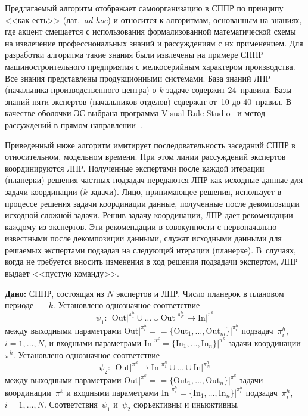 \begin{multicols}{2}
  Предлагаемый алгоритм отображает самоорганизацию в СППР по принципу 
<<как есть>> (лат.\ \textit{ad hoc}) и относится к алгоритмам, основанным на знаниях, 
где акцент смещается с использования формализованной математической 
схемы на извлечение профессиональных знаний и рассуждениям с их 
применением. Для разработки алгоритма такие знания были извлечены на 
примере СППР машиностроительного предприятия с мелкосерийным 
характером производства. Все знания пред\-став\-ле\-ны продукционными 
системами. База знаний ЛПР (начальника производственного центра) о 
  $k$-за\-да\-че содержит 24~правила. Базы знаний пяти экспертов 
(начальников отделов) содержат от~10 до 40~правил. В качестве оболочки ЭС 
выбрана программа Visual Rule Studio~\cite{14kol} и метод рассуждений в 
прямом направлении~\cite{8kol}.
  
  Приведенный ниже алгоритм имитирует последовательность заседаний 
СППР в относительном, модельном времени. При этом линии рассуждений 
экспертов координируются ЛПР. Полученные экспертами после каждой 
итерации (планерки) решения частных подзадач передаются ЛПР как исходные 
данные для задачи координации ($k$-за\-да\-чи). Лицо, принимающее решения, использует в процессе 
решения задачи координации данные, полученные после декомпозиции 
исходной сложной задачи. Решив задачу координации, ЛПР дает рекомендации 
каждому из экспертов. Эти рекомендации в совокупности с первоначально 
известными после декомпозиции  данными, служат исходными данными для 
решаемых экспертами подзадач на следующей итерации (планерке). В~случаях, 
когда не требуется вносить изменения в ход решения подзадачи экспертом, 
ЛПР выдает <<пустую команду>>.

\smallskip
  
\noindent
  \textbf{Дано:} СППР, состоящая из $N$ экспертов и ЛПР. Число планерок в 
плановом периоде~--- $k$. Установлено однозначное соответствие 
$$\psi_1:\ \ 
\mathrm{Out}\vert^{\pi_1^h}\cup\ldots \cup \mathrm{Out}\vert^{\pi_N^h}\rightarrow \mathrm{In}\vert^{\pi^k}
$$ 
между выходными параметрами $\mathrm{Out}\vert^{\pi_i^h}=$\linebreak $=\{\mathrm{Out}_1, \ldots , 
\mathrm{Out}_m\}\vert^{\pi_i^h}$ подзадач~$\pi_i^h$, $i=1, \ldots , N$, и входными 
параметрами $\mathrm{In}\vert^{\pi^k}=\{\mathrm{In}_1, \ldots , \mathrm{In}_n\}\vert^{\pi^k}$ задачи 
координации~$\pi^k$. Установлено однозначное соответствие
$$
\psi_2:\ \ 
\mathrm{Out}\vert^{\pi^k}\rightarrow \mathrm{In}\vert^{\pi_1^h}\cup\ldots\cup \mathrm{In}\vert^{\pi_N^h}
$$ 
между выходными параметрами $\mathrm{Out}\vert^{\pi^k}=$\linebreak $=\{\mathrm{Out}_1, \ldots 
,\mathrm{Out}_n\}\vert^{\pi^k}$ задачи координации~$\pi^k$ и входными параметрами 
$\mathrm{In}\vert^{\pi_i^h} =\{\mathrm{In}_1, \ldots ,\mathrm{In}_n\}\vert^{\pi_i^h}$ подзадач~$\pi_i^h$, $i=1, 
\ldots , N$. Соответствия~$\psi_1$ и~$\psi_2$ сюръективны и иньюктивны.


\end{multicols}
